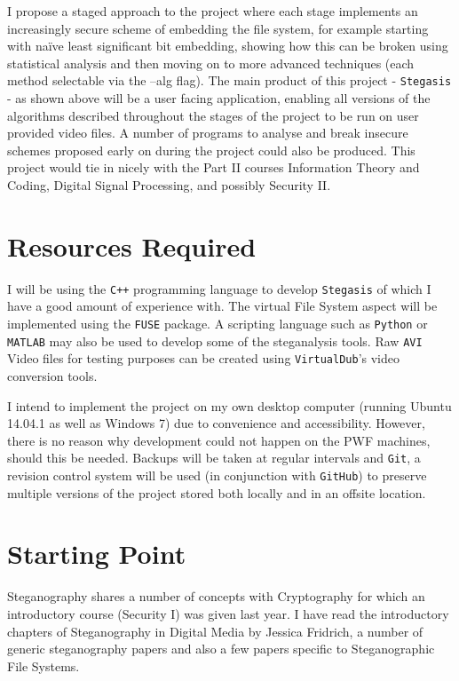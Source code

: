 \documentclass[paper=a4, fontsize=11pt,twoside]{scrartcl}    %
\numberwithin{table}{section}
\numberwithin{figure}{section}
\numberwithin{algorithm}{section}
\begin{document}
I propose a staged approach to the project where each stage implements an increasingly secure scheme of embedding the file system, for example starting with na\"{i}ve least significant bit embedding, showing how this can be broken using statistical analysis and then moving on to more advanced techniques (each method selectable via the --alg flag).
The main product of this project - \texttt{Stegasis} - as shown above will be a user facing application, enabling all versions of the algorithms described throughout the stages of the project to be run on user provided video files. A number of programs to analyse and break insecure schemes proposed early on during the project could also be produced.
This project would tie in nicely with the Part II courses Information Theory and Coding, Digital Signal Processing, and possibly Security II.

\section*{Resources Required}
I will be using the \texttt{C++} programming language to develop \texttt{Stegasis} of which I have a good amount of experience with. The virtual File System aspect will be implemented using the \texttt{FUSE} package. A scripting language such as \texttt{Python} or \texttt{MATLAB} may also be used to develop some of the steganalysis tools. Raw \texttt{AVI} Video files for testing purposes can be created using \texttt{VirtualDub}'s video conversion tools.

I intend to implement the project on my own desktop computer (running Ubuntu 14.04.1 as well as Windows 7) due to convenience and accessibility. However, there is no reason why development could not happen on the PWF machines, should this be needed.
Backups will be taken at regular intervals and \texttt{Git}, a revision control system will be used (in conjunction with \texttt{GitHub}) to preserve multiple versions of the project stored both locally and in an offsite location.

\section*{Starting Point}
Steganography shares a number of concepts with Cryptography for which an introductory course (Security I) was given last year. I have read the introductory chapters of Steganography in Digital Media by Jessica Fridrich, a number of generic steganography papers and also a few papers specific to Steganographic File Systems.
\end{document}
